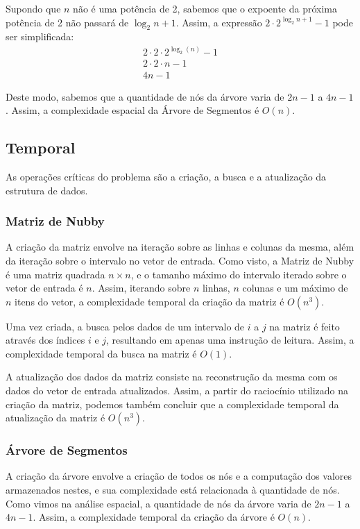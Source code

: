 \documentclass{article}
\begin{document}
Supondo que $n$ não é uma potência de 2, sabemos que o expoente da próxima potência de 2 não passará de ${\log_2 n} + 1$. Assim, a expressão $2 \cdot 2^{\log_2 n + 1} - 1$ pode ser simplificada:
\begin{gather*}
  2 \cdot 2 \cdot 2^{\log_2(n)} - 1 \\
  2 \cdot 2 \cdot n - 1 \\
  4n - 1
\end{gather*}

Deste modo, sabemos que a quantidade de nós da árvore varia de $2n - 1$ a $4n - 1$. Assim, a complexidade espacial da Árvore de Segmentos é $O(n)$.

\subsection{Temporal}
As operações críticas do problema são a criação, a busca e a atualização da estrutura de dados.

\subsubsection{Matriz de Nubby}

A criação da matriz envolve na iteração sobre as linhas e colunas da mesma, além da iteração sobre o intervalo no vetor de entrada. Como visto, a Matriz de Nubby é uma matriz quadrada $n \times n$, e o tamanho máximo do intervalo iterado sobre o vetor de entrada é $n$. Assim, iterando sobre $n$ linhas, $n$ colunas e um máximo de $n$ itens do vetor, a complexidade temporal da criação da matriz é $O(n^3)$.

Uma vez criada, a busca pelos dados de um intervalo de $i$ a $j$ na matriz é feito através dos índices $i$ e $j$, resultando em apenas uma instrução de leitura. Assim, a complexidade temporal da busca na matriz é $O(1)$.

A atualização dos dados da matriz consiste na reconstrução da mesma com os dados do vetor de entrada atualizados. Assim, a partir do raciocínio utilizado na criação da matriz, podemos também concluir que a complexidade temporal da atualização da matriz é $O(n^3)$.

\subsubsection{Árvore de Segmentos}

A criação da árvore envolve a criação de todos os nós e a computação dos valores armazenados nestes, e sua complexidade está relacionada à quantidade de nós. Como vimos na análise espacial, a quantidade de nós da árvore varia de $2n - 1$ a $4n - 1$. Assim, a complexidade temporal da criação da árvore é $O(n)$.
\end{document}
